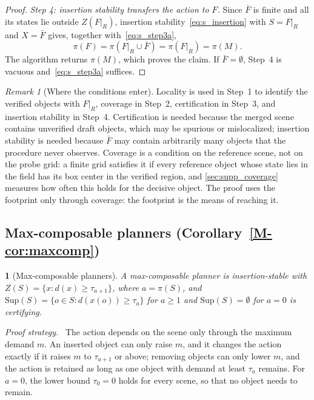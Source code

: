 \documentclass[10pt,letterpaper]{article}
\newcommand{\full}{F}
\newcommand{\merged}{M}
\newcommand{\Sup}{\mathrm{Sup}}
\newcommand{\field}{Z}
\newcommand{\policy}{\pi}
\newcommand{\dem}{d}
\theoremstyle{remark}
\newtheorem{remark}{Remark}
\theoremstyle{plain}
\newtheorem*{restatedinner}{\restatedname}
\newcommand{\restatedname}{}
\newenvironment{restated}[3]{\renewcommand{\restatedname}{#1~#2}\begin{restatedinner}[#3]}{\end{restatedinner}}
\theoremstyle{definition}
\newenvironment{strategy}{\par\noindent\textit{Proof strategy.}\ }{\par}
\newcommand{\mrefnum}[1]{\ref*{M-#1}}
\begin{document}
\begin{proof}
\emph{Step 4: insertion stability transfers the action to $\full$.}
Since $\bar\full$ is finite and all its states lie outside $\field(\full|_R)$, insertion stability~\cref{eq:s_insertion} with $S=\full|_R$ and $X=\bar\full$ gives, together with~\cref{eq:s_step3a},
\begin{equation}
\policy(\full)=\policy(\full|_R\cup\bar\full)=\policy(\full|_R)=\policy(\merged).
\end{equation}
The algorithm returns $\policy(\merged)$, which proves the claim.
If $\bar\full=\emptyset$, Step~4 is vacuous and~\cref{eq:s_step3a} suffices.
\end{proof}

\begin{remark}[Where the conditions enter]
Locality is used in Step~1 to identify the verified objects with $\full|_R$, coverage in Step~2, certification in Step~3, and insertion stability in Step~4.
Certification is needed because the merged scene contains unverified draft objects, which may be spurious or mislocalized; insertion stability is needed because $\bar\full$ may contain arbitrarily many objects that the procedure never observes.
Coverage is a condition on the reference scene, not on the probe grid: a finite grid satisfies it if every reference object whose state lies in the field has its box center in the verified region, and \cref{sec:supp_coverage} measures how often this holds for the decisive object. The proof uses the footprint only through coverage: the footprint is the means of reaching it.
\end{remark}

\subsection{Max-composable planners (Corollary~\protect\mrefnum{cor:maxcomp})}
\label{sec:proof_maxcomp}

\begin{restated}{Corollary}{\mrefnum{cor:maxcomp}}{Max-composable planners}
A max-composable planner is insertion-stable with $\field(S)=\{x:\dem(x)\ge\tau_{a+1}\}$, where $a=\policy(S)$, and $\Sup(S)=\{o\in S:\dem(x(o))\ge\tau_a\}$ for $a\ge1$ and $\Sup(S)=\emptyset$ for $a=0$ is certifying.
\end{restated}

\begin{strategy}
The action depends on the scene only through the maximum demand $m$.
An inserted object can only raise $m$, and it changes the action exactly if it raises $m$ to $\tau_{a+1}$ or above; removing objects can only lower $m$, and the action is retained as long as one object with demand at least $\tau_a$ remains.
For $a=0$, the lower bound $\tau_0=0$ holds for every scene, so that no object needs to remain.
\end{strategy}
\end{document}
